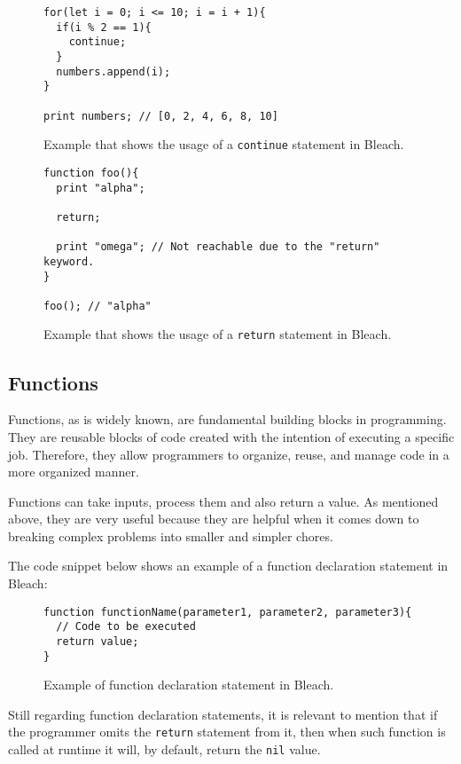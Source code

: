 \begin{itemize}
\begin{figure}[H]
\begin{lstlisting}
for(let i = 0; i <= 10; i = i + 1){
  if(i % 2 == 1){
    continue;
  }
  numbers.append(i);
}

print numbers; // [0, 2, 4, 6, 8, 10]
    \end{lstlisting}
    \caption{Example that shows the usage of a \texttt{continue} statement in Bleach.}
\end{figure}

\begin{figure}[H]
    \centering
    \begin{lstlisting}
function foo(){
  print "alpha";

  return;

  print "omega"; // Not reachable due to the "return" keyword.
}

foo(); // "alpha"
    \end{lstlisting}
    \caption{Example that shows the usage of a \texttt{return} statement in Bleach.}
\end{figure}
\end{itemize}

\subsection{Functions}
Functions, as is widely known, are fundamental building blocks in programming. They are reusable blocks of code created with the intention of executing a specific job. Therefore, they allow programmers to organize, reuse, and manage code in a more organized manner.

Functions can take inputs, process them and also return a value. As mentioned above, they are very useful because they are helpful when it comes down to breaking complex problems into smaller and simpler chores.

The code snippet below shows an example of a function declaration statement in Bleach:

\begin{figure}[H]
    \centering
    \begin{lstlisting}
function functionName(parameter1, parameter2, parameter3){
  // Code to be executed
  return value;
}
    \end{lstlisting}
    \caption{Example of function declaration statement in Bleach.}
\end{figure}

Still regarding function declaration statements, it is relevant to mention that if the programmer omits the \texttt{return} statement from it, then when such function is called at runtime it will, by default, return the \texttt{nil} value.

